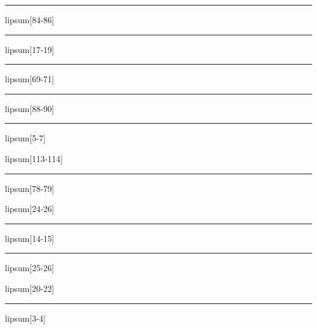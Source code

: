 \documentclass[11pt,a4paper]{article}
\begin{document}
\begin{simplewrap}
  \textcolor{teal!54}{\rule{5.8cm}{5.0cm}}
\end{simplewrap}
lipsum[84-86]

\begin{simplewrap}
  \textcolor{green!56}{\rule{5.9cm}{7.1cm}}
\end{simplewrap}
lipsum[17-19]

\begin{simplewrap}
  \textcolor{pink!23}{\rule{5.9cm}{8.6cm}}
\end{simplewrap}
lipsum[69-71]

\begin{simplewrap}
  \textcolor{violet!31}{\rule{4.6cm}{3.0cm}}
\end{simplewrap}
lipsum[88-90]

\begin{simplewrap}
  \textcolor{blue!12}{\rule{3.3cm}{8.3cm}}
\end{simplewrap}
lipsum[5-7]

lipsum[113-114]

\begin{simplewrap}
  \textcolor{blue!10}{\rule{6.0cm}{5.4cm}}
\end{simplewrap}
lipsum[78-79]

lipsum[24-26]

\begin{simplewrap}
  \textcolor{lime!26}{\rule{3.2cm}{7.3cm}}
\end{simplewrap}
lipsum[14-15]

\begin{simplewrap}
  \textcolor{violet!56}{\rule{5.1cm}{3.9cm}}
\end{simplewrap}
lipsum[25-26]

lipsum[20-22]

\begin{simplewrap}
  \textcolor{purple!47}{\rule{3.7cm}{7.4cm}}
\end{simplewrap}
lipsum[3-4]
\end{document}
